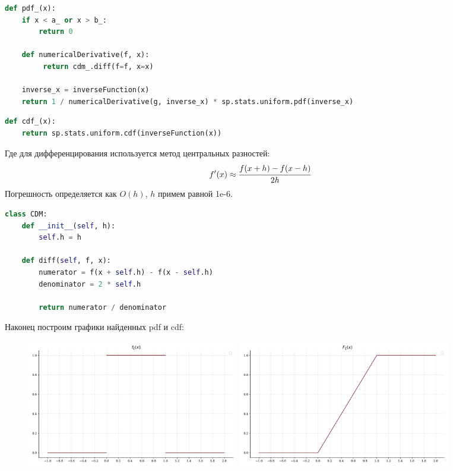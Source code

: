 \documentclass[a4paper, 14pt]{extarticle}
\begin{document}
\begin{center}
  \begin{lstlisting}[language=Python]
def pdf_(x):
    if x < a_ or x > b_:
        return 0

    def numericalDerivative(f, x):
         return cdm_.diff(f=f, x=x)
    
    inverse_x = inverseFunction(x)
    return 1 / numericalDerivative(g, inverse_x) * sp.stats.uniform.pdf(inverse_x)
  \end{lstlisting}
\end{center}

\begin{center}
  \begin{lstlisting}[language=Python]
def cdf_(x):
    return sp.stats.uniform.cdf(inverseFunction(x))
  \end{lstlisting}
\end{center}

Где для дифференцирования используется метод центральных разностей:
\begin{equation*}
  f'(x) \approx \cfrac{f(x+h) - f(x-h)}{2h}
\end{equation*}
Погрешность определяется как $O(h)$, $h$ примем равной 1e-6.\\

\begin{center}
  \begin{lstlisting}[language=Python]
class CDM:
    def __init__(self, h):
        self.h = h
    
    def diff(self, f, x):
        numerator = f(x + self.h) - f(x - self.h)
        denominator = 2 * self.h

        return numerator / denominator
  \end{lstlisting}
\end{center}

Наконец построим графики найденных pdf и cdf:

\begin{figure}[h]
  \centering
  \includegraphics[width=0.45\textwidth, height=0.45\textheight, keepaspectratio]{uniform_pdf}
  \hspace{0.05\textwidth}
  \includegraphics[width=0.45\textwidth, height=0.45\textheight, keepaspectratio]{uniform_cdf}
\end{figure}
\end{document}
